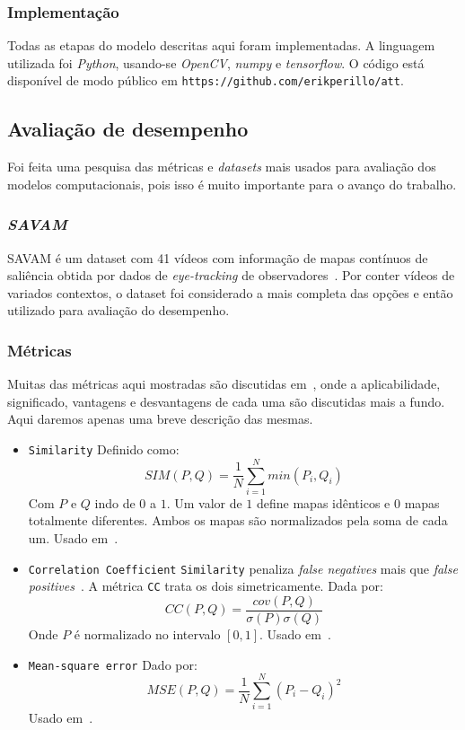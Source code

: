 \documentclass[article]{IEEEtran}
\newcommand{\tit}[1]{\textit{#1}}
\newcommand{\ttt}[1]{\texttt{#1}}
\begin{document}
\subsubsection{Implementação}
Todas as etapas do modelo descritas aqui foram implementadas.
A linguagem utilizada foi \tit{Python}, usando-se \tit{OpenCV}, \tit{numpy}
e \tit{tensorflow}.
O código está disponível de modo público em \ttt{https://github.com/erikperillo/att}.

\subsection{Avaliação de desempenho}
Foi feita uma pesquisa das métricas e \tit{datasets} mais usados para
avaliação dos modelos computacionais, pois isso
é muito importante para o avanço do trabalho.

\subsubsection{\tit{SAVAM}}
SAVAM é um dataset com 41 vídeos com informação de mapas contínuos de
saliência obtida por dados de \tit{eye-tracking} de observadores~\cite{savam}.
Por conter vídeos de variados contextos, o dataset foi considerado a
mais completa das opções e então utilizado para avaliação do desempenho.

\subsubsection{Métricas}
Muitas das métricas aqui mostradas são discutidas em~\cite{judd2},
onde a aplicabilidade, significado, vantagens e desvantagens
de cada uma são discutidas mais a fundo. Aqui daremos apenas uma breve
descrição das mesmas.

\begin{itemize}
	\item \ttt{Similarity}\newline
	Definido como:
	$$SIM(P, Q) = \frac{1}{N}\sum\limits_{i=1}^N{min(P_i, Q_i)}$$
	Com $P$ e $Q$ indo de $0$ a $1$. Um valor de $1$ define mapas idênticos
	e $0$ mapas totalmente diferentes.
	Ambos os mapas são normalizados pela soma de cada um.
	Usado em~\cite{mit-300}.

	\item \ttt{Correlation Coefficient}\newline
	\ttt{Similarity} penaliza \tit{false negatives} mais que
	\tit{false positives}~\cite{judd2}. A métrica \ttt{CC} trata os dois
	simetricamente. Dada por:
	$$CC(P, Q) = \frac{cov(P,Q)}{\sigma(P)\sigma(Q)}$$
	Onde $P$ é normalizado no intervalo $[0, 1]$.
	Usado em~\cite{mit-300}.

	\item \ttt{Mean-square error}\newline
	Dado por:
    $$MSE(P, Q) = \frac{1}{N}\sum\limits_{i=1}^N{{(P_i - Q_i)}^2}$$
	Usado em~\cite{mit-300}.
\end{itemize}
\end{document}
